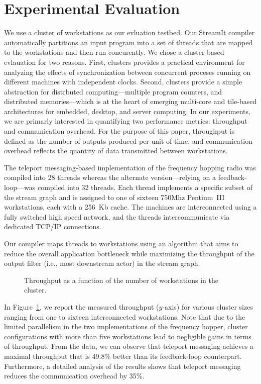 \section{Experimental Evaluation}
\label{sec:evaluation}

We use a cluster of workstations as our evluation testbed. Our
StreamIt compiler automatically partitions an input program into a set
of threads that are mapped to the workstations and then run concurently.
We chose a cluster-based evlauation for two reasons. First, clusters
provides a practical environment for analyzing the effects of
synchronization between concurrent proceses running on different
machines with independent clocks. Second, clusters provide a
simple abstraction for distrbuted computing---multiple program
counters, and distributed memories---which 
is at the heart of emerging multi-core and tile-based architectures
for embedded, desktop, and server computing.
In our experiments, we are primarly interested in quantifying two
performance metrics: throughput and communication overhead.
For the purpose of this paper, throughput is defined
as the number of outputs produced per unit of time, and communication
overhead reflects the quantity of data transmitted between
workstations.


The teleport messaging-based implementation of the frequency hopping
radio was compiled into 28 threads
whereas the alternate version---relying on a feedback-loop---was
compiled into 32 threads.  Each thread implements a
specific subset of the stream graph  and is assigned to one of
sixteen 750Mhz Pentium~III workstations, each with a
256~Kb cache.  The machines are interconnected using a fully switched
high speed network, and the threads intercommunicate via
dedicated  TCP/IP connections. 

Our compiler maps threads to workstations using an algorithm that aims
to reduce the overall application bottleneck while
maximizing the throughput of the output filter (i.e., most downstream
actor) in the stream graph.

\begin{figure}[t]
\caption{\small Throughput as a function of the number of workstations
in the cluster. 
\protect\label{fig:fhr-throughput}}
\end{figure}

In Figure~\ref{fig:fhr-throughput}, we report the measured throughput 
($y$-axis) for various cluster sizes ranging from one to sixteen
interconnected workstations. Note that due to the limited parallelism in the
two implementations of the frequency hopper, cluster configurations
with more than five workstations lead to negligible gains in
terms of throughput. From the data, we can observe that teleport
messaging achieves a maximal throughput that is 49.8\% better than its
feedback-loop counterpart. Furthermore, a detailed analysis of the
results shows that teleport messaging reduces the communication
overhead by 35\%.
